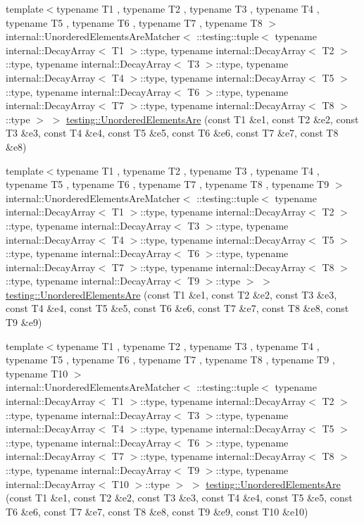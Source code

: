 \begin{DoxyCompactItemize}
\item 
{\footnotesize template$<$typename T1 , typename T2 , typename T3 , typename T4 , typename T5 , typename T6 , typename T7 , typename T8 $>$ }\\internal\+::\+Unordered\+Elements\+Are\+Matcher$<$ \+::testing\+::tuple$<$ typename internal\+::\+Decay\+Array$<$ T1 $>$\+::type, typename internal\+::\+Decay\+Array$<$ T2 $>$\+::type, typename internal\+::\+Decay\+Array$<$ T3 $>$\+::type, typename internal\+::\+Decay\+Array$<$ T4 $>$\+::type, typename internal\+::\+Decay\+Array$<$ T5 $>$\+::type, typename internal\+::\+Decay\+Array$<$ T6 $>$\+::type, typename internal\+::\+Decay\+Array$<$ T7 $>$\+::type, typename internal\+::\+Decay\+Array$<$ T8 $>$\+::type $>$ $>$ \mbox{\hyperlink{namespacetesting_a0f30358234947d21c7f39f15a8395d04}{testing\+::\+Unordered\+Elements\+Are}} (const T1 \&e1, const T2 \&e2, const T3 \&e3, const T4 \&e4, const T5 \&e5, const T6 \&e6, const T7 \&e7, const T8 \&e8)
\item 
{\footnotesize template$<$typename T1 , typename T2 , typename T3 , typename T4 , typename T5 , typename T6 , typename T7 , typename T8 , typename T9 $>$ }\\internal\+::\+Unordered\+Elements\+Are\+Matcher$<$ \+::testing\+::tuple$<$ typename internal\+::\+Decay\+Array$<$ T1 $>$\+::type, typename internal\+::\+Decay\+Array$<$ T2 $>$\+::type, typename internal\+::\+Decay\+Array$<$ T3 $>$\+::type, typename internal\+::\+Decay\+Array$<$ T4 $>$\+::type, typename internal\+::\+Decay\+Array$<$ T5 $>$\+::type, typename internal\+::\+Decay\+Array$<$ T6 $>$\+::type, typename internal\+::\+Decay\+Array$<$ T7 $>$\+::type, typename internal\+::\+Decay\+Array$<$ T8 $>$\+::type, typename internal\+::\+Decay\+Array$<$ T9 $>$\+::type $>$ $>$ \mbox{\hyperlink{namespacetesting_a2e03e363e193ef512bf9fa964c484375}{testing\+::\+Unordered\+Elements\+Are}} (const T1 \&e1, const T2 \&e2, const T3 \&e3, const T4 \&e4, const T5 \&e5, const T6 \&e6, const T7 \&e7, const T8 \&e8, const T9 \&e9)
\item 
{\footnotesize template$<$typename T1 , typename T2 , typename T3 , typename T4 , typename T5 , typename T6 , typename T7 , typename T8 , typename T9 , typename T10 $>$ }\\internal\+::\+Unordered\+Elements\+Are\+Matcher$<$ \+::testing\+::tuple$<$ typename internal\+::\+Decay\+Array$<$ T1 $>$\+::type, typename internal\+::\+Decay\+Array$<$ T2 $>$\+::type, typename internal\+::\+Decay\+Array$<$ T3 $>$\+::type, typename internal\+::\+Decay\+Array$<$ T4 $>$\+::type, typename internal\+::\+Decay\+Array$<$ T5 $>$\+::type, typename internal\+::\+Decay\+Array$<$ T6 $>$\+::type, typename internal\+::\+Decay\+Array$<$ T7 $>$\+::type, typename internal\+::\+Decay\+Array$<$ T8 $>$\+::type, typename internal\+::\+Decay\+Array$<$ T9 $>$\+::type, typename internal\+::\+Decay\+Array$<$ T10 $>$\+::type $>$ $>$ \mbox{\hyperlink{namespacetesting_ae0e6c9754b17623a64358da8d38c4d13}{testing\+::\+Unordered\+Elements\+Are}} (const T1 \&e1, const T2 \&e2, const T3 \&e3, const T4 \&e4, const T5 \&e5, const T6 \&e6, const T7 \&e7, const T8 \&e8, const T9 \&e9, const T10 \&e10)

\end{DoxyCompactItemize}
